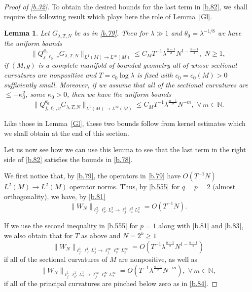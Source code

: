 \documentclass[10pt]{amsart}
\newtheorem{lemma}[theorem]{Lemma}
\newcommand{\la}{\lambda}
\newcommand{\1}{{\bf 1}}
\begin{document}
\begin{proof}[Proof of \eqref{b.32}]
To obtain the desired bounds for the last term in \eqref{b.82}, we shall require the following result which plays here
the role of Lemma~\ref{Gl}.


\begin{lemma}\label{G2}  Let $G_{\la,T,N}$ be as in \eqref{b.79}.  Then for $\la\gg 1$ and $\theta_0=\la^{-1/8}$ we have the uniform bounds
\begin{equation}\label{b.83}
\bigl\| Q^{\theta_0}_{j,\ell_0,\nu} G_{\la,T,N}
\bigr\|_{L^1(M)\to L^\infty(M)} \le C_M T^{-1} \la^{\frac{n-1}2}
N^{1-\frac{n-1}2}, \, \, N\ge 1, 
\end{equation}
if $(M,g)$ is a complete manifold of bounded geometry all of whose sectional curvatures are nonpositive and
$T=c_0\log\la$ is fixed with $c_0=c_0(M)>0$ sufficiently small.  Moreover, if we assume that all of the sectional curvatures
are $\le -\kappa_0^2$, some $\kappa_0>0$, then we have the uniform bounds
\begin{equation}\label{b.84}
\bigl\| Q^{\theta_0}_{j,\ell_0,\nu} G_{\la,T,N}
\bigr\|_{L^1(M)\to L^\infty(M)}\le C_M T^{-1} \la^{\frac{n-1}2}
N^{-m}, \, \, \forall \, m\in {\mathbb N}.
\end{equation}
\end{lemma}


Like those in Lemma~\ref{Gl}, these two bounds follow from kernel estimates which we shall obtain at the end of this section.


Let us now see how we can use this lemma to see that the last term in the right side of \eqref{b.82} satisfies the
bounds in \eqref{b.78}.


We first notice that, by \eqref{b.79}, the operators in \eqref{b.79} have $O(T^{-1}N)$  $L^2(M)\to L^2(M)$ operator norms.
Thus, by \eqref{b.555} for $q=p=2$ (almost orthogonality), we have, by \eqref{b.81}
\begin{equation}\label{b.85}
\bigl\|
W_N 
\bigr\|_{\ell^2_{j'}\ell^2_{\nu'}L^2_x\to \ell^2_j\ell^2_\nu L^2_x}=O(T^{-1}N).
\end{equation}


If we use the second inequality in \eqref{b.555} for $p=1$ along with \eqref{b.81}
and \eqref{b.83}, we also obtain that for $T$ as above and $N=2^k\ge1$
\begin{equation}\label{b.86}
\|W_N\|_{\ell^1_{j'}\ell^1_{\nu'}L^1_x \to \ell^\infty_j \ell^\infty_\nu L^\infty_x}=
O(T^{-1}\la^{\frac{n-1}2}N^{1-\frac{n-1}2})
\end{equation}
if all of the sectional curvatures of $M$ are nonpositive, as well as
\begin{equation}\label{b.87}
\|W_N\|_{\ell^1_{j'}\ell^1_{\nu'}L^1_x \to \ell^\infty_j \ell^\infty_\nu L^\infty_x}=
O(T^{-1}\la^{\frac{n-1}2}N^{-m}), \, \,  \forall \, m\in {\mathbb N},
\end{equation}
if all of the principal curvatures are pinched below zero as in \eqref{b.84}.





\end{proof}
\end{document}
